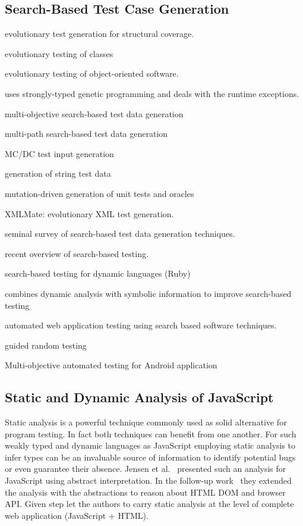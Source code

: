 \documentclass[sigconf]{acmart}
\begin{document}
\subsection{Search-Based Test Case Generation}
\label{sub.sec.search.based}

\cite{wegener2001evolutionary} evolutionary test generation for structural coverage.

\cite{tonella2004evolutionary} evolutionary testing of classes

\cite{wappler2005using} evolutionary testing of object-oriented software.

\cite{wappler2006evolutionary} uses strongly-typed genetic programming and deals with the runtime exceptions.

\cite{lakhotia2007multi} multi-objective search-based test data generation 

\cite{cao2009search} multi-path search-based test data generation

\cite{awedikian2009mc} MC/DC test input generation 

\cite{shahbazi2016black} generation of string test data

\cite{fraser2012mutation} mutation-driven generation of unit tests and oracles

\cite{havrikov2014xmlmate} XMLMate: evolutionary XML test generation.

\cite{mcminn2004search} seminal survey of search-based test data generation techniques.

\cite{mcminn2011search} recent overview of search-based testing.

\cite{mairhofer2011search} search-based testing for dynamic languages (Ruby)

\cite{baars2011symbolic} combines dynamic analysis with symbolic information to improve search-based testing

\cite{alshahwan2011automated} automated web application testing using search based software techniques.

\cite{ma2015grt} guided random testing

\cite{mao2016sapienz} Multi-objective automated testing for Android application

\subsection{Static and Dynamic Analysis of JavaScript}
\label{sub.sec.js.static.anal}

Static analysis is a powerful technique commonly used as solid alternative for program testing. In fact both techniques can benefit from one another. For such weakly typed and dynamic languages as JavaScript employing static analysis to infer types can be an invaluable source of information to identify potential bugs or even guarantee their absence. Jensen et al.~\cite{tajs2009} presented such an analysis for JavaScript using abstract interpretation. In the follow-up work~\cite{dom2011} they extended the analysis with the abstractions to reason about HTML DOM and browser API. Given step let the authors to carry static analysis at the level of complete web application (JavaScript + HTML).
\cite{jquery2014}
\end{document}
